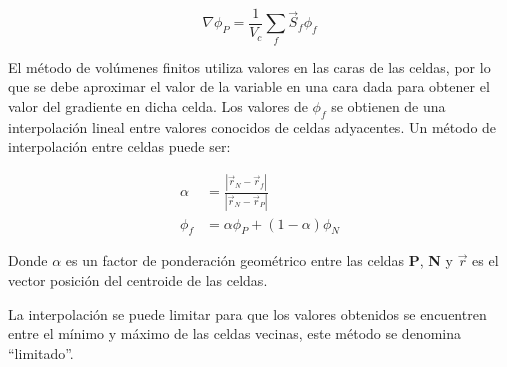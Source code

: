 \begin{equation}
  \label{eq:green_gauss_gradient}
  \nabla \phi_{P} = \frac{1}{V_{c}}\sum_{f} \vec{S}_{f}\phi_{f}
\end{equation}

El método de volúmenes finitos utiliza valores en las caras de las celdas, por
lo que se debe aproximar el valor de la variable en una cara dada para obtener
el valor del gradiente en dicha celda.
%
Los valores de $\phi_{f}$ se obtienen de una interpolación lineal entre valores
conocidos de celdas adyacentes.
%
Un método de interpolación entre celdas puede ser:

\begin{align}
  \label{eq:interpolacion_lineal_caras}
  \alpha &= \frac{|{\vec{r}_{N}-\vec{r}_{f}}|} {|{\vec{r}_{N}-\vec{r}_{P}}|}\\
  \phi_{f} &= \alpha\phi_{P}+(1-\alpha)\phi_{N}
\end{align}

Donde $\alpha$ es un factor de ponderación geométrico entre las celdas
\textbf{P}, \textbf{N} y $\vec{r}$ es el vector posición del centroide de las
celdas.

La interpolación se puede limitar para que los valores obtenidos se encuentren
entre el mínimo y máximo de las celdas vecinas, este método se denomina
``limitado''.




